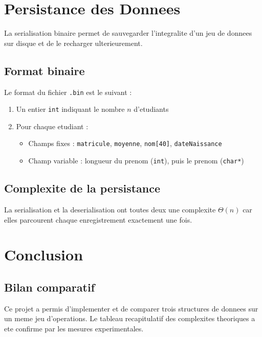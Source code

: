 \documentclass[12pt,a4paper]{article}
\begin{document}
\section{Persistance des Donnees}

La serialisation binaire permet de sauvegarder l'integralite
d'un jeu de donnees sur disque et de le recharger ulterieurement.

\subsection{Format binaire}

Le format du fichier \texttt{.bin} est le suivant :

\begin{enumerate}
    \item Un entier \texttt{int} indiquant le nombre $n$ d'etudiants
    \item Pour chaque etudiant :
    \begin{itemize}
        \item Champs fixes : \texttt{matricule}, \texttt{moyenne},
              \texttt{nom[40]}, \texttt{dateNaissance}
        \item Champ variable : longueur du prenom (\texttt{int}),
              puis le prenom (\texttt{char*})
    \end{itemize}
\end{enumerate}

\subsection{Complexite de la persistance}

La serialisation et la deserialisation ont toutes deux une
complexite $\Theta(n)$ car elles parcourent chaque enregistrement
exactement une fois.

\section{Conclusion}

\subsection{Bilan comparatif}

Ce projet a permis d'implementer et de comparer trois structures
de donnees sur un meme jeu d'operations. Le tableau recapitulatif
des complexites theoriques a ete confirme par les mesures experimentales.
\end{document}
